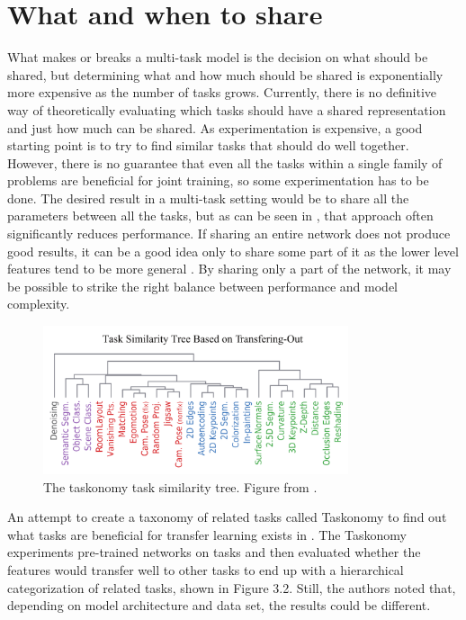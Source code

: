 \section{What and when to share}
What makes or breaks a multi-task model is the decision on what should be shared, but determining what and how much should be shared is exponentially more expensive as the number of tasks grows.
Currently, there is no definitive way of theoretically evaluating which tasks should have a shared representation and just how much can be shared.
As experimentation is expensive, a good starting point is to try to find similar tasks that should do well together. 
However, there is no guarantee that even all the tasks within a single family of problems are beneficial for joint training, so some experimentation has to be done. 
The desired result in a multi-task setting would be to share all the parameters between all the tasks, but as can be seen in \citep{uberNet}, that approach often significantly reduces performance.
If sharing an entire network does not produce good results, it can be a good idea only to share some part of it as the lower level features tend to be more general \citep{transferringMidLevelRepresentations}. 
By sharing only a part of the network, it may be possible to strike the right balance between performance and model complexity.

\begin{figure}[h!] 
\centering 
\includegraphics[width=0.8\textwidth]{imgs/taskonomy.png}
\caption{The taskonomy task similarity tree. Figure from \citep{taskonomy}.\label{fig:params}}
\end{figure}

An attempt to create a taxonomy of related tasks called Taskonomy to find out what tasks are beneficial for transfer learning exists in \citep{taskonomy}. 
The Taskonomy experiments pre-trained networks on tasks and then evaluated whether the features would transfer well to other tasks to end up with a hierarchical categorization of related tasks, shown in Figure 3.2. 
Still, the authors noted that, depending on model architecture and data set, the results could be different.

